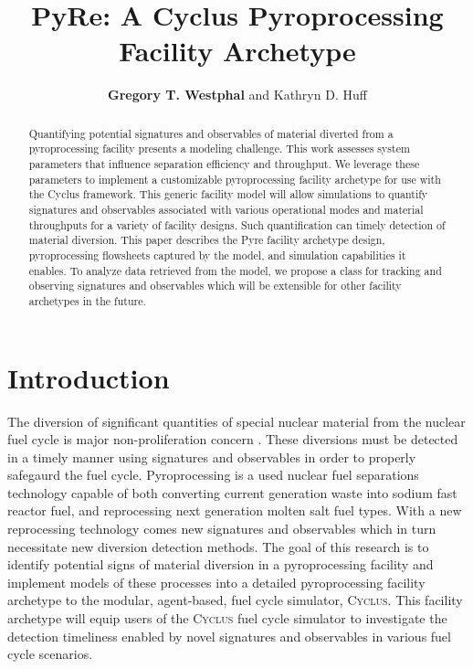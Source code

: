 \documentclass{anstrans}
\title{PyRe: A Cyclus Pyroprocessing Facility Archetype}
\author{\textbf{Gregory T. Westphal} and Kathryn D. Huff}
\institute{
Dept. of Nuclear, Plasma and Radiological Engineering, University of Illinois at Urbana-Champaign \\
gtw2@illinois.edu
}
\newcommand{\Cyclus}{\textsc{Cyclus}\xspace}%
\begin{document}
\begin{abstract}
Quantifying potential signatures and observables of material diverted from a 
pyroprocessing facility presents a modeling challenge.
This work assesses system parameters that influence separation efficiency and 
throughput. We leverage these parameters to implement a customizable pyroprocessing facility archetype for use with the Cyclus framework.
This generic facility model will allow simulations to 
quantify signatures and observables associated with various operational modes 
and material throughputs for a variety of facility designs. Such quantification 
can timely detection of material diversion. 
This paper describes the Pyre facility archetype design, pyroprocessing flowsheets captured by the model, and simulation capabilities it enables. 
To analyze data retrieved from the model, we propose a class for tracking and 
observing signatures and observables which will be extensible for other 
facility archetypes in the future.
\end{abstract}
\section{Introduction}
The diversion of significant quantities of special nuclear material from the nuclear fuel cycle is major non-proliferation 
concern \cite{noauthor_iaea_2017}. These diversions must be detected in a timely manner using signatures and observables in 
order to properly safegaurd the fuel cycle. Pyroprocessing is a used nuclear fuel separations technology capable of both 
converting current generation waste into sodium fast reactor fuel, and reprocessing next generation molten salt fuel types. 
With a new reprocessing technology comes new signatures and observables which in turn necessitate new diversion detection methods. 
The goal of this research is to identify potential signs of material diversion in a pyroprocessing facility and implement models 
of these processes into a detailed pyroprocessing facility archetype to the modular, agent-based, fuel cycle simulator, \Cyclus \cite{huff_fundamental_2016}. This facility archetype will equip users of the \Cyclus fuel cycle simulator to investigate the 
detection timeliness enabled by novel signatures and observables in various fuel cycle scenarios.
\end{document}
